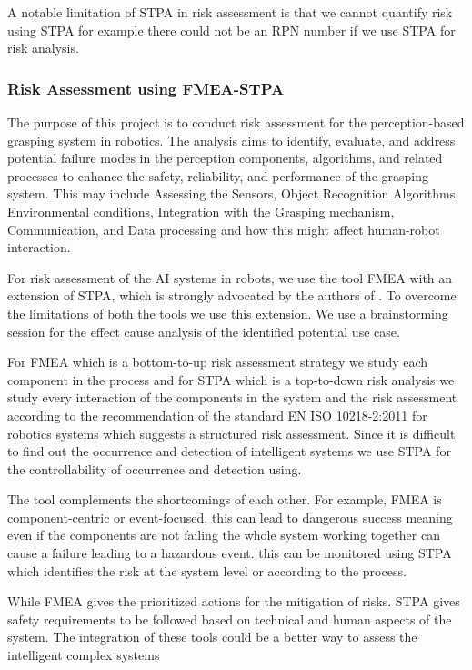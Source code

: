 {A notable limitation of STPA in risk assessment is that we cannot quantify risk using STPA for example there could not be an RPN number if we use STPA for risk analysis.

\subsubsection{\RaggedRight Risk Assessment using FMEA-STPA } 

The purpose of this project is to conduct risk assessment for the perception-based grasping system in robotics. The analysis aims to identify, evaluate, and address potential failure modes in the perception components, algorithms, and related processes to enhance the safety, reliability, and performance of the grasping system. This may include Assessing the Sensors, Object Recognition Algorithms, Environmental conditions, Integration with the Grasping mechanism, Communication, and Data processing and how this might affect human-robot interaction.

For risk assessment of the AI systems in robots, we use the tool FMEA with an extension of STPA, which is strongly advocated by the authors of \cite{author30}. To overcome the limitations of both the tools we use this extension. We use a brainstorming session for the effect cause analysis of the identified potential use case.

For FMEA which is a bottom-to-up risk assessment strategy we study each component in the process and for STPA which is a top-to-down risk analysis we study every interaction of the components in the system and the risk assessment according to the recommendation of the standard EN ISO 10218-2:2011 for robotics systems which suggests a structured risk assessment. Since it is difficult to find out the occurrence and detection of intelligent systems we use STPA for the controllability of occurrence and detection using.

The tool complements the shortcomings of each other. For example, FMEA is component-centric or event-focused, this can lead to dangerous success meaning even if the components are not failing the whole system working together can cause a failure leading to a hazardous event. this can be monitored using STPA which identifies the risk at the system level or according to the process.

While FMEA gives the prioritized actions for the mitigation of risks. STPA gives safety requirements to be followed based on technical and human aspects of the system. The integration of these tools could be a better way to assess the intelligent complex systems

}
